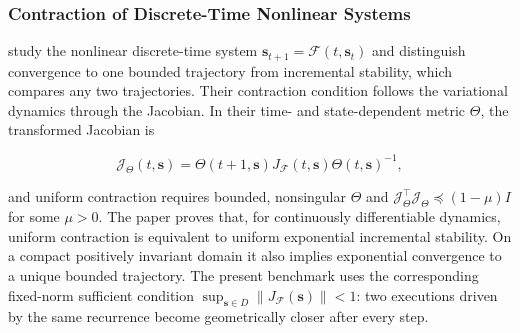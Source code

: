 \subsubsection{Contraction of Discrete-Time Nonlinear Systems}

\citet{tran2019convergence} study the nonlinear discrete-time system
$\mathbf{s}_{t+1}=\mathcal F(t,\mathbf{s}_t)$ and distinguish convergence to
one bounded trajectory from incremental stability, which compares any two
trajectories. Their contraction condition follows the variational dynamics
through the Jacobian. In their time- and state-dependent metric $\Theta$, the
transformed Jacobian is

\begin{equation}
    \mathcal J_{\Theta}(t,\mathbf{s})
    =
    \Theta(t+1,\mathbf{s})
    J_{\mathcal F}(t,\mathbf{s})
    \Theta(t,\mathbf{s})^{-1},
\end{equation}

and uniform contraction requires bounded, nonsingular $\Theta$ and
$\mathcal J_{\Theta}^{\top}\mathcal J_{\Theta}\preceq(1-\mu)I$ for some
$\mu>0$. The paper proves that, for continuously differentiable dynamics,
uniform contraction is equivalent to uniform exponential incremental
stability. On a compact positively invariant domain it also implies exponential
convergence to a unique bounded trajectory. The present benchmark uses the
corresponding fixed-norm sufficient condition
$\sup_{\mathbf{s}\in D}\|J_{\mathcal F}(\mathbf{s})\|<1$: two executions
driven by the same recurrence become geometrically closer after every step.
